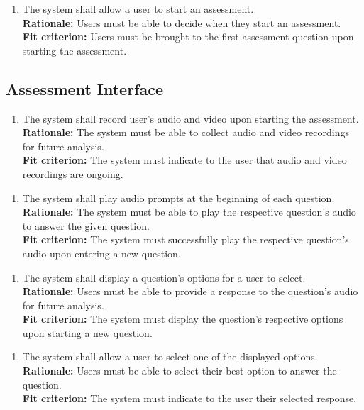 \documentclass[12pt]{article}
\begin{document}
\begin{enumerate}[{FR-SS}5. ]
  \item The system shall allow a user to start an assessment.\\
  \textbf{Rationale: }Users must be able to decide when they start an assessment.\\
  \textbf{Fit criterion: }Users must be brought to the first assessment question upon starting the assessment.  
\end{enumerate}

\subsection{Assessment Interface}
\begin{enumerate}[{FR-AI}1. ]
  \item The system shall record user's audio and video upon starting the assessment.\\
  \textbf{Rationale: }The system must be able to collect audio and video recordings for future analysis.\\
  \textbf{Fit criterion: }The system must indicate to the user that audio and video recordings are ongoing.  
\end{enumerate}
\begin{enumerate}[{FR-AI}2. ]
  \item The system shall play audio prompts at the beginning of each question.\\
  \textbf{Rationale: }The system must be able to play the respective question's audio to answer the given question.\\
  \textbf{Fit criterion: }The system must successfully play the respective question's audio upon entering a new question.
\end{enumerate}
\begin{enumerate}[{FR-AI}3. ]
  \item The system shall display a question's options for a user to select.\\
  \textbf{Rationale: }Users must be able to provide a response to the question's audio for future analysis.\\
  \textbf{Fit criterion: }The system must display the question's respective options upon starting a new question.
\end{enumerate}
\begin{enumerate}[{FR-AI}4. ]
  \item The system shall allow a user to select one of the displayed options.\\
  \textbf{Rationale: }Users must be able to select their best option to answer the question.\\
  \textbf{Fit criterion: }The system must indicate to the user their selected response.
\end{enumerate}
\end{document}
